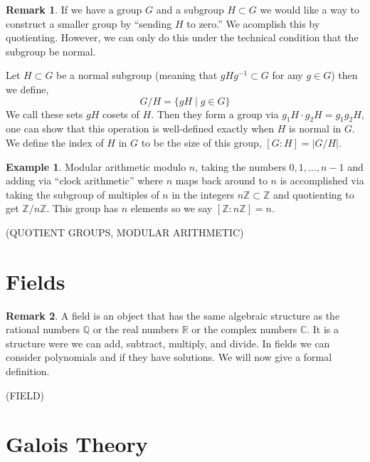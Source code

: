 \documentclass{article}
\newcommand{\Z}{\mathbb{Z}}
\newcommand{\R}{\mathbb{R}}
\newcommand{\Q}{\mathbb{Q}}
\newcommand{\C}{\mathbb{C}}
\theoremstyle{definition}
\newtheorem{example}[theorem]{Example}
\newtheorem{remark}{Remark}[section]
\newenvironment{definition}[1][Definition:]{\begin{trivlist}
\item[\hskip \labelsep {\bfseries #1}]}{\end{trivlist}}
\begin{document}
\begin{remark}
If we have a group $G$ and a subgroup $H \subset G$ we would like a way to construct a  smaller group by ``sending $H$ to zero.'' We acomplish this by quotienting. However, we can only do this under the technical condition that the subgroup be normal.
\end{remark}

\begin{definition}
Let $H \subset G$ be a normal subgroup (meaning that $g H g^{-1} \subset G$ for any $g \in G$) then we define,
\[ G / H = \{ g H \mid g \in G \} \]
We call these sets $g H$ cosets of $H$. Then they form a group via $g_1 H \cdot g_2 H = g_1 g_2 H$, one can show that this operation is well-defined exactly when $H$ is normal in $G$. We define the index of $H$ in $G$ to be the size of this group, $[G : H] = |G / H|$.
\end{definition}

\begin{example}
Modular arithmetic modulo $n$, taking the numbers $0, 1, \dots, n-1$ and adding via ``clock arithmetic'' where $n$ maps back around to $n$ is accomplished via taking the subgroup of multiples of $n$ in the integers $n \Z \subset \Z$ and quotienting to get $\Z / n \Z$. This group has $n$ elements so we say $[\Z : n \Z] = n$. 
\end{example}

(QUOTIENT GROUPS, MODULAR ARITHMETIC)

\section{Fields}

\begin{remark}
A field is an object that has the same algebraic structure as the rational numbers $\Q$ or the real numbers $\R$ or the complex numbers $\C$. It is a structure were we can add, subtract, multiply, and divide. In fields we can consider polynomials and if they have solutions. We will now give a formal definition.
\end{remark}

\begin{definition}
(FIELD)
\end{definition}

\section{Galois Theory}
\end{document}
